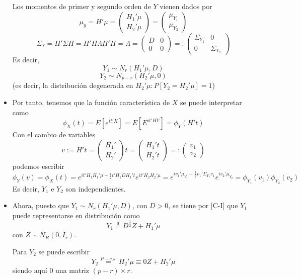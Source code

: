 \documentclass[11pt,a4paper]{article}
\begin{document}
\begin{itemize}
Los momentos de primer y segundo orden de $Y$ vienen dados por
$$\mu_{y} = H'\mu = \begin{pmatrix} H_{1}'\mu \\ H_{2}'\mu \end{pmatrix} = \begin{pmatrix} \mu_{Y_{1}} \\ \mu_{Y_{2}} \end{pmatrix}$$
$$\Sigma_{Y} = H'\Sigma H = H'H \Lambda H'H = \Lambda = \begin{pmatrix}
D & 0 \\
0 & 0
\end{pmatrix} =: \begin{pmatrix}
\Sigma_{Y_{1}} & 0 \\
0 & \Sigma_{Y_{2}}
\end{pmatrix}$$
Es decir,
$$Y_{1} \sim N_{r}(H_{1}'\mu, D)$$
$$Y_{2} \sim N_{p-r}(H_{2}'\mu, 0)$$
(es decir, la distribución degenerada en $H_{2}'\mu: P[Y_{2} = H_{2}'\mu] = 1$)

\item Por tanto, tenemos que la función característica de $X$ se puede interpretar como
$$\phi_{X}(t) = E[e^{it'X}] = E[E^{it'HY}] = \phi_{Y}(H't)$$
Con el cambio de variables
$$v := H't = \begin{pmatrix} H_{1}' \\ H_{2}' \end{pmatrix} t = \begin{pmatrix} H_{1}'t \\ H_{2}'t \end{pmatrix} =: \begin{pmatrix} v_{1} \\ v_{2} \end{pmatrix}$$
podemos escribir
$$\phi_{Y}(v) = \phi_{X}(t) = e^{it'H_{1}H_{1}'\mu - \frac{1}{2}t'H_{1}DH_{1}'t} e^{it'H_{2}H_{2}'\mu} = e^{iv_{1}'\mu_{Y_{1}} - \frac{1}{2}v_{1}'\Sigma_{Y_{1}}v_{1}}e^{iv_{2}'\mu_{Y_{2}}} = \phi_{Y_{1}}(v_{1})\phi_{Y_{2}}(v_{2})$$
Es decir, $Y_{1}$ e $Y_{2}$ son independientes.

\item Ahora, puesto que $Y_{1} \sim N_{r} (H_{1}'\mu, D)$, con $D > 0$, se tiene por [C-I] que $Y_{1}$ puede representarse en distribución como
$$Y_{1} \overset{d}{=} D^{\frac{1}{2}}Z + H_{1}'\mu$$
con $Z \sim N_{R}(0, I_{r})$.

Para $Y_{2}$ se puede escribir
$$Y_{2} \overset{P-c.s.}{=} H_{2}'\mu \equiv 0Z + H_{2}'\mu$$
siendo aquí 0 una matriz $(p-r) \times r$.


\end{itemize}
\end{document}
